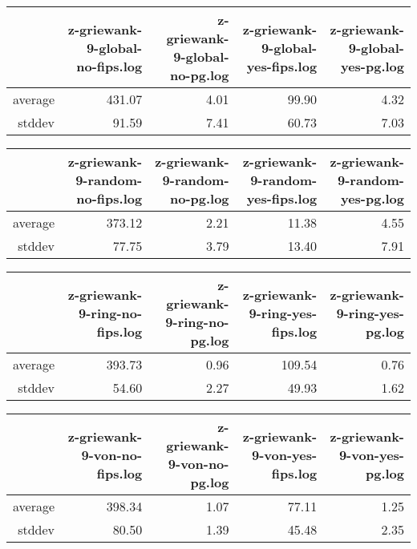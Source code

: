 \begin{table}[ht]
\centering
\begin{tabular}{rrrrr}
  \hline
 & z-griewank-9-global-no-fips.log & z-griewank-9-global-no-pg.log & z-griewank-9-global-yes-fips.log & z-griewank-9-global-yes-pg.log \\ 
  \hline
average & 431.07 & 4.01 & 99.90 & 4.32 \\ 
  stddev & 91.59 & 7.41 & 60.73 & 7.03 \\ 
   \hline
\end{tabular}
\end{table}
\begin{table}[ht]
\centering
\begin{tabular}{rrrrr}
  \hline
 & z-griewank-9-random-no-fips.log & z-griewank-9-random-no-pg.log & z-griewank-9-random-yes-fips.log & z-griewank-9-random-yes-pg.log \\ 
  \hline
average & 373.12 & 2.21 & 11.38 & 4.55 \\ 
  stddev & 77.75 & 3.79 & 13.40 & 7.91 \\ 
   \hline
\end{tabular}
\end{table}
\begin{table}[ht]
\centering
\begin{tabular}{rrrrr}
  \hline
 & z-griewank-9-ring-no-fips.log & z-griewank-9-ring-no-pg.log & z-griewank-9-ring-yes-fips.log & z-griewank-9-ring-yes-pg.log \\ 
  \hline
average & 393.73 & 0.96 & 109.54 & 0.76 \\ 
  stddev & 54.60 & 2.27 & 49.93 & 1.62 \\ 
   \hline
\end{tabular}
\end{table}
\begin{table}[ht]
\centering
\begin{tabular}{rrrrr}
  \hline
 & z-griewank-9-von-no-fips.log & z-griewank-9-von-no-pg.log & z-griewank-9-von-yes-fips.log & z-griewank-9-von-yes-pg.log \\ 
  \hline
average & 398.34 & 1.07 & 77.11 & 1.25 \\ 
  stddev & 80.50 & 1.39 & 45.48 & 2.35 \\ 
   \hline
\end{tabular}
\end{table}
